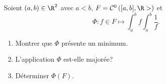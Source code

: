 \begin{enonce}
\begin{exercise}[ID={RMS125 E580, 2014 Mines-Ponts MP},subtitle={2014 Mines-Ponts MP},tags={}]
Soient $(a,b)\in\R^2$ avec $a<b$, $F=\mathcal{C}^0\left( [a,b], \R> \right)$ et
\begin{equation*}
  \Phi: f\in F\mapsto \int_a^b f \int_a^b \frac1f.
\end{equation*}
\begin{enumerate}
  \item Montrer que $\Phi$ présente un minimum.
  \item L'application $\Phi$ est-elle majorée?
  \item Déterminer $\Phi(F)$.
\end{enumerate}
\end{exercise}
\begin{solution}
\end{solution}
\end{enonce}
